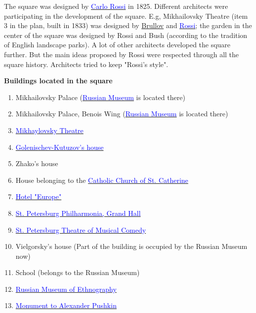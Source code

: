 \documentclass[a4paper]{article}
\newcommand{\myhref}[2]{{\href{#1}{\textcolor{blue}{#2}}}}
\begin{document}
The square was designed by \myhref{http://en.wikipedia.org/wiki/Carlo_Rossi_(architect)}{Carlo Rossi} in 1825. Different architects were participating in the
development of the square. E.g, Mikhailovsky Theatre (item 3 in the plan, built in 1833) was designed by \href{http://en.wikipedia.org/wiki/Alexander_Brullov}{Brullov}
and \myhref{http://en.wikipedia.org/wiki/Carlo_Rossi_(architect)}{Rossi}; the garden in the center of the square was designed by Rossi and Bush (according to the
tradition of English landscape parks). A lot of other architects developed the square further. But the main ideas proposed by Rossi were respected through all
the square history. Architects tried to keep "Rossi's style".

\medskip
\centerline{\large\bf Buildings located in the square}

\begin{multicols}{2}
\begin{enumerate}
\item Mikhailovsky Palace (\myhref{http://en.wikipedia.org/wiki/Russian_Museum}{Russian Museum} is located there)
\item Mikhailovsky Palace, Benois Wing (\myhref{http://en.wikipedia.org/wiki/Russian_Museum}{Russian Museum} is located there)
\item \myhref{http://en.wikipedia.org/wiki/Mikhaylovsky_Theatre}{Mikhaylovsky Theatre}
\item \myhref{http://www.encspb.ru/object/2804024725?lc=en}{Golenischev-Kutuzov's house}
\item Zhako's house
\item House belonging to the \myhref{http://en.wikipedia.org/wiki/Catholic_Church_of_St._Catherine}{Catholic Church of St. Catherine}
\item \myhref{http://en.wikipedia.org/wiki/Grand_Hotel_Europe}{Hotel "Europe"}
\item \myhref{http://en.wikipedia.org/wiki/Saint_Petersburg_Philharmonia}{St. Petersburg Philharmonia, Grand Hall}
\item \myhref{http://spbmuzcomedy.com/en/}{St. Petersburg Theatre of Musical Comedy}
\item Vielgorsky's house (Part of the building is occupied by the Russian Museum now)
\item School (belongs to the Russian Museum)
\item \myhref{http://en.wikipedia.org/wiki/Russian_Museum_of_Ethnography}{Russian Museum of Ethnography}
\item \myhref{http://www.saint-petersburg.com/monuments/alexander-pushkin/}{Monument to Alexander Pushkin}
\end{enumerate}
\end{multicols}
\newpage
\end{document}
